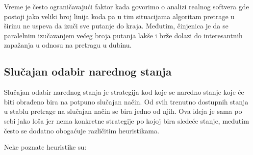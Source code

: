 \documentclass[12pt,oneside]{memoir}
\begin{document}
Vreme je često ograničavajući faktor kada govorimo o analizi realnog softvera gde postoji jako veliki broj linija koda pa u tim situacijama algoritam pretrage u širinu ne uspeva da izuči sve putanje do kraja. Međutim, činjenica je da se paralelnim izučavanjem većeg broja putanja lakše i brže dolazi do interesantnih zapažanja u odnosu na pretragu u dubinu.

\bigbreak

\subsection{Slučajan odabir narednog stanja} 
Slučajan odabir narednog stanja je strategija kod koje se naredno stanje koje će biti obrađeno bira na potpuno slučajan način. Od svih trenutno dostupnih stanja u stablu pretrage na slučajan način se bira jedno od njih. Ova ideja je sama po sebi jako loša jer nema konkretne strategije po kojoj bira sledeće stanje, međutim često se dodatno obogaćuje različitim heuristikama. 

Neke poznate heuristike su:
\end{document}
